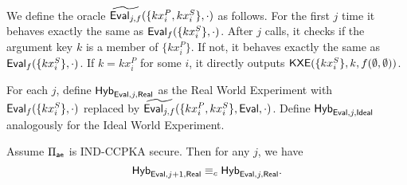 \begin{definition}
We define the oracle $\widetilde{\mathsf{Eval}_{j, f}}(\{kx_i^P, kx_i^S\}, \cdot)$ as follows. For the first $j$ time it behaves exactly the same as $\mathsf{Eval}_f(\{kx_i^S\}, \cdot)$. After $j$ calls, it checks if the argument key $k$ is a member of $\{kx_i^P\}$. If not, it behaves exactly the same as $\mathsf{Eval}_f(\{kx_i^S\}, \cdot)$. If $k = kx_i^P$ for some $i$, it directly outputs $\mathsf{KXE}(\{kx_i^S\}, k, f(\emptyset, \emptyset))$.

    For each $j$, define $\mathsf{Hyb}_{\mathsf{Eval}, j, \mathsf{Real}}$ as the Real World Experiment with $\mathsf{Eval}_f(\{kx_i^S\}, \cdot)$ replaced by $\widetilde{\mathsf{Eval}_{j, f}}(\{kx_i^P, kx_i^S\}, \mathsf{Eval}, \cdot)$. Define $\mathsf{Hyb}_{\mathsf{Eval}, j, \mathsf{Ideal}}$ analogously for the Ideal World Experiment. 
\end{definition}
\begin{lemma}
     Assume $\Pi_{\mathsf{ae}}$ is IND-CCPKA secure. Then for any $j$, we have 
    $$\mathsf{Hyb}_{\mathsf{Eval}, j + 1, \mathsf{Real}} \equiv_c \mathsf{Hyb}_{\mathsf{Eval}, j, \mathsf{Real}}.$$
\end{lemma}
